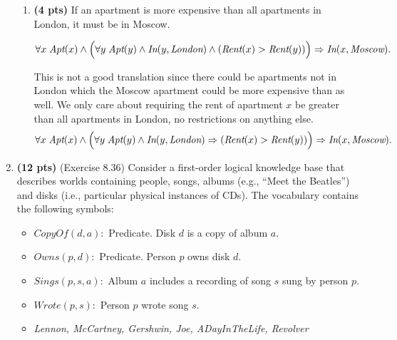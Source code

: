 \documentclass{article}
\begin{document}
\begin{enumerate}
\begin{enumerate}[label=($\alph*$)]


    \item \textbf{(4 pts)} If an apartment is more expensive than all apartments in London, it must be in Moscow.

    \[\forall x \; \mbox{\it Apt}(x) \wedge \Bigl(\forall y\; \mbox{\it Apt}(y) \wedge \mbox{\it In}(y, \mbox{\it London}) \wedge (\mbox{\it Rent}(x) > \mbox{\it Rent}(y))\Bigr) \Rightarrow \mbox{\it In}(x, \mbox{\it Moscow}).\]

    \color{blue}
        This is not a good translation since there could be apartments not in London which the Moscow apartment could be more expensive than as well. We only care about requiring the rent of apartment $x$ be greater than all apartments in London, no restrictions on anything else.
        \[\forall x \; \mbox{\it Apt}(x) \wedge \Bigl(\forall y\; \mbox{\it Apt}(y) \wedge \mbox{\it In}(y, \mbox{\it London}) \Rightarrow (\mbox{\it Rent}(x) > \mbox{\it Rent}(y))\Bigr) \Rightarrow \mbox{\it In}(x, \mbox{\it Moscow}).\]
    \color{black}

    
    \end{enumerate}



\item \textbf{(12 pts)} (Exercise 8.36) Consider a first-order logical knowledge base that describes worlds containing people, songs, albums (e.g., “Meet the Beatles”) and disks (i.e., particular physical instances of CDs). The vocabulary contains the following symbols:

\begin{itemize}
    \item $CopyOf(d, a):$ Predicate. Disk $d$ is a copy of album $a$.
    \item $Owns(p, d):$ Predicate. Person $p$ owns disk $d$.
    \item $Sings(p, s, a):$ Album $a$ includes a recording of song $s$ sung by person $p$.
    \item $Wrote(p, s):$ Person $p$ wrote song $s$.
    \item \textit{Lennon, McCartney, Gershwin, Joe, ADayInTheLife, Revolver}
\end{itemize}


\end{enumerate}
\end{document}
